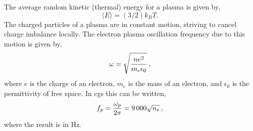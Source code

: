 The average random kinetic (thermal) energy for a plasma is given by,
\begin{equation}
\langle E \rangle = (3/2) k_B T \mbox{.}
\end{equation}
The charged particles of a plasma are in constant motion, striving to cancel charge imbalance locally. The electron plasma oscillation frequency due to this motion is given by,
\begin{equation}
\omega = \sqrt{\frac{n e^2}{m_e \epsilon_0}} \mbox{\,,}
\end{equation} 
where $e$ is the charge of an electron, $m_e$ is the mass of an electron, and $\epsilon_0$ is the permittivity of free space. In \gls{cgs} this can be written,
\begin{equation}
f_p = \frac{\omega_p}{2 \pi} = 9\,000 \sqrt{n_e} \mbox{\,,}
\end{equation}
where the result is in Hz. 

